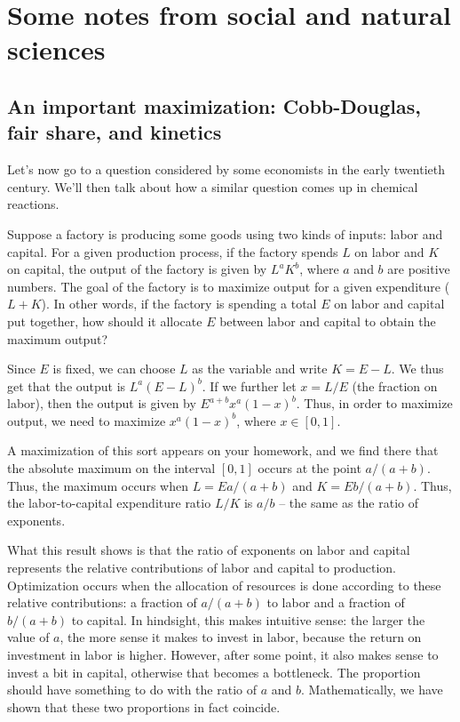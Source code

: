 \documentclass[10pt]{amsart}
\begin{document}
\section{Some notes from social and natural sciences}

\subsection{An important maximization: Cobb-Douglas, fair share, and kinetics}

Let's now go to a question considered by some economists in the early
twentieth century. We'll then talk about how a similar question comes
up in chemical reactions.

Suppose a factory is producing some goods using two kinds of inputs:
labor and capital. For a given production process, if the factory
spends $L$ on labor and $K$ on capital, the output of the factory is
given by $L^aK^b$, where $a$ and $b$ are positive numbers. The goal of
the factory is to maximize output for a given expenditure ($L +
K$). In other words, if the factory is spending a total $E$ on labor
and capital put together, how should it allocate $E$ between labor and
capital to obtain the maximum output?

Since $E$ is fixed, we can choose $L$ as the variable and write $K = E
- L$. We thus get that the output is $L^a(E - L)^b$. If we further let
$x = L/E$ (the fraction on labor), then the output is given by $E^{a +
  b}x^a(1 - x)^b$. Thus, in order to maximize output, we need to
maximize $x^a(1 - x)^b$, where $x \in [0,1]$.

A maximization of this sort appears on your homework, and we find
there that the absolute maximum on the interval $[0,1]$ occurs at the
point $a/(a + b)$. Thus, the maximum occurs when $L = Ea/(a + b)$ and
$K = Eb/(a + b)$. Thus, the labor-to-capital expenditure ratio $L/K$
is $a/b$ -- the same as the ratio of exponents.

What this result shows is that the ratio of exponents on labor and
capital represents the relative contributions of labor and capital to
production. Optimization occurs when the allocation of resources is
done according to these relative contributions: a fraction of $a/(a +
b)$ to labor and a fraction of $b/(a + b)$ to capital. In hindsight,
this makes intuitive sense: the larger the value of $a$, the more
sense it makes to invest in labor, because the return on investment in
labor is higher. However, after some point, it also makes sense to
invest a bit in capital, otherwise that becomes a bottleneck. The
proportion should have something to do with the ratio of $a$ and
$b$. Mathematically, we have shown that these two proportions in fact
coincide.
\end{document}
